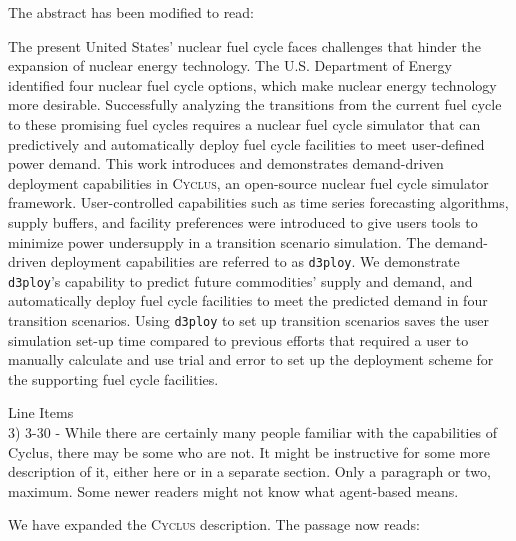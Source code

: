 \documentclass[answers,11pt]{exam}
\newcommand{\Cyclus}{\textsc{Cyclus}\xspace}%
\newcommand{\deploy}{\texttt{d3ploy}\xspace}%
\begin{document}
\begin{questions}
\begin{solution}
The abstract has been modified to read: 

The present United States' nuclear fuel cycle faces challenges that hinder 
the expansion of nuclear energy technology. 
The U.S. Department of Energy identified four nuclear fuel cycle 
options, which make nuclear energy technology
more desirable. 
Successfully analyzing the transitions from the current 
fuel cycle to these promising fuel cycles requires a nuclear 
fuel cycle simulator that can predictively and automatically 
deploy fuel cycle facilities to meet user-defined power demand. 
This work introduces and demonstrates demand-driven deployment 
capabilities in \Cyclus, an open-source nuclear fuel cycle simulator framework.  
User-controlled capabilities such as time series forecasting algorithms, supply buffers, 
and facility preferences were introduced to give users tools to minimize power 
undersupply in a transition scenario simulation. 
The demand-driven deployment capabilities are referred to as \deploy. 
We demonstrate \deploy's capability to predict future commodities' 
supply and demand, and automatically deploy fuel 
cycle facilities to meet the predicted demand in four transition scenarios. 
Using \deploy to set up transition scenarios saves the user 
simulation set-up time compared to previous efforts that
required a user to manually calculate and use trial and error 
to set up the deployment scheme for the supporting fuel cycle 
facilities. 
\end{solution}

\question Line Items \\
3) 3-30 - While there are certainly many people familiar with the capabilities of Cyclus, there may be
some who are not. It might be instructive for some more description of it, either here or in a separate
section. Only a paragraph or two, maximum. Some newer readers might not know what agent-based
means.

\begin{solution}
We have expanded the \Cyclus description. The passage now reads: 


\end{solution}
\end{questions}
\end{document}
